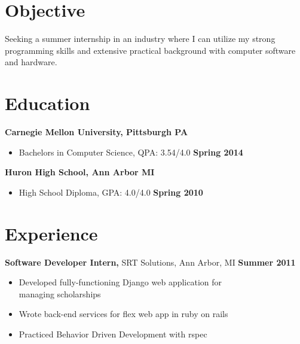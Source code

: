 \documentclass[sectioned]{dsyangres}
\begin{document}
 

 
\address{{\bf School Address} \\
  5032 forbes ave. SMC 4932 \\ Pittsburgh, PA 15289  \\
         }
\address{{\bf Home Address} \\
  5313 Betheny Circle \\
  Superior Township, MI 48198 \\
   }

 
\begin{resume} 
 
\section{Objective} 

Seeking a summer internship in an industry where I can utilize my strong programming
skills and extensive practical background with computer software and hardware.


\section{Education}

\textbf{Carnegie Mellon University, Pittsburgh PA}
  \begin{itemize}
    \item Bachelors in Computer Science, QPA: 3.54/4.0 \hfill \textbf{ Spring 2014}
  \end{itemize}

\textbf{Huron High School, Ann Arbor MI}
  \begin{itemize}
    \item High School Diploma, GPA: 4.0/4.0 \hfill \textbf{ Spring 2010}
  \end{itemize}


\section{Experience}

\textbf{Software Developer Intern,}
  SRT Solutions, Ann Arbor, MI \hfill \textbf{Summer 2011} 

  \begin{itemize} \itemsep -2pt
    \item Developed fully-functioning Django web application for\\ 
      managing scholarships
    \item Wrote back-end services for flex web app in ruby 
      on rails
    \item Practiced Behavior Driven Development with rspec
  \end{itemize}


\end{resume}
\end{document}
